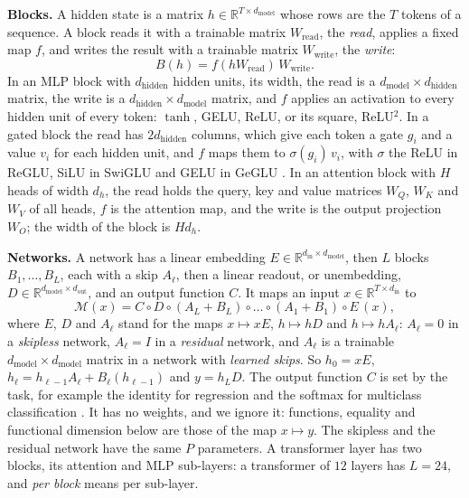 \documentclass[10pt]{article}
\theoremstyle{definition}
\theoremstyle{remark}
\newcommand{\R}{\mathbb{R}}
\newcommand{\Wread}{W_{\mathrm{read}}}
\newcommand{\Wwrite}{W_{\mathrm{write}}}
\newcommand{\dm}{d_{\mathrm{model}}}
\newcommand{\dhid}{d_{\mathrm{hidden}}}
\newcommand{\para}[1]{\smallskip\noindent\textbf{#1}\hspace{0.5em}}
\begin{document}
\para{Blocks.} A hidden state is a matrix $h \in \R^{T\times\dm}$ whose rows are the $T$ tokens of a sequence. A block reads it with a trainable matrix $\Wread$, the \emph{read}, applies a fixed map $f$, and writes the result with a trainable matrix $\Wwrite$, the \emph{write}:
\begin{equation}\label{eq:block}
B(h) = f(h\Wread)\,\Wwrite.
\end{equation}
In an MLP block with $\dhid$ hidden units, its width, the read is a $\dm\times\dhid$ matrix, the write is a $\dhid\times\dm$ matrix, and $f$ applies an activation to every hidden unit of every token: $\tanh$, GELU, ReLU, or its square, ReLU$^2$. In a gated block the read has $2\dhid$ columns, which give each token a gate $g_i$ and a value $v_i$ for each hidden unit, and $f$ maps them to $\sigma(g_i)\,v_i$, with $\sigma$ the ReLU in ReGLU, SiLU in SwiGLU and GELU in GeGLU \citep{shazeer2020glu}. In an attention block with $H$ heads of width $d_h$, the read holds the query, key and value matrices $W_Q$, $W_K$ and $W_V$ of all heads, $f$ is the attention map, and the write is the output projection $W_O$; the width of the block is $Hd_h$.

\para{Networks.} A network has a linear embedding $E \in \R^{d_{\mathrm{in}}\times\dm}$, then $L$ blocks $B_1, \dots, B_L$, each with a skip $A_\ell$, then a linear readout, or unembedding, $D \in \R^{\dm\times d_{\mathrm{out}}}$, and an output function $C$. It maps an input $x \in \R^{T\times d_{\mathrm{in}}}$ to
\begin{equation}\label{eq:nets}
\mathcal M(x) = C \circ D \circ (A_L + B_L) \circ \dots \circ (A_1 + B_1) \circ E\,(x),
\end{equation}
where $E$, $D$ and $A_\ell$ stand for the maps $x \mapsto xE$, $h \mapsto hD$ and $h \mapsto hA_\ell$: $A_\ell = 0$ in a \emph{skipless} network, $A_\ell = I$ in a \emph{residual} network, and $A_\ell$ is a trainable $\dm\times\dm$ matrix in a network with \emph{learned skips}. So $h_0 = xE$, $h_\ell = h_{\ell-1}A_\ell + B_\ell(h_{\ell-1})$ and $y = h_LD$. The output function $C$ is set by the task, for example the identity for regression and the softmax for multiclass classification \citep[Sections~5.1 and~5.2]{bishop2006pattern}. It has no weights, and we ignore it: functions, equality and functional dimension below are those of the map $x \mapsto y$. The skipless and the residual network have the same $P$ parameters. A transformer layer has two blocks, its attention and MLP sub-layers: a transformer of $12$ layers has $L = 24$, and \emph{per block} means per sub-layer.
\end{document}
